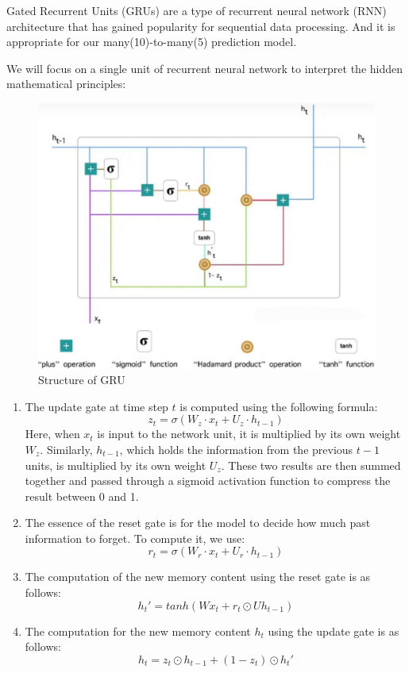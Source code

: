 Gated Recurrent Units (GRUs) are a type of recurrent neural network (RNN) 
architecture that has gained popularity for sequential data processing. 
And it is appropriate for our many(10)-to-many(5) prediction model.

We will focus on a single unit of recurrent neural network to interpret the hidden mathematical principles:
\begin{figure}[H]
    \centering
    \includegraphics[scale=0.15]{mainmatter/imgs/6.jpg}
    \caption{Structure of GRU}
\end{figure}

\begin{enumerate}
    \item 
    The update gate at time step $t$ is computed using the following formula:  
    $$  z_t = \sigma(W_z \cdot x_t + U_z \cdot h_{t-1})  $$  
    Here, when $x_t$ is input to the network unit, 
    it is multiplied by its own weight $W_z$. 
    Similarly, $h_{t-1}$, which holds the information from the previous $t-1$ units, 
    is multiplied by its own weight $U_z$. These two results are then summed together 
    and passed through a sigmoid activation function to compress the result between 0 and 1. 
  
    \item 
    The essence of the reset gate is for the model to decide how much past information to forget. To compute it, we use:  
    $$  r_t = \sigma(W_r \cdot x_t + U_r \cdot h_{t-1})  $$  

    \item 
    The computation of the new memory content using the reset gate is as follows:  
    $$ h_t'= tanh(Wx_t+r_t\odot Uh_{t-1})$$

    \item 
    The computation for the new memory content $h_t$ using the update gate is as follows:  
    $$ h_t=z_t\odot h_{t-1}+(1-z_t)\odot h_t'$$ 
\end{enumerate}

